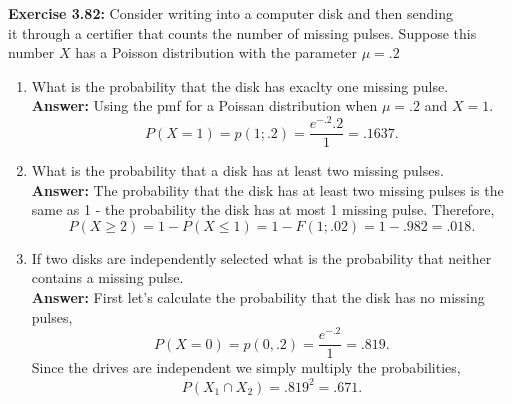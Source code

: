 \documentclass[12pt]{article}
\theoremstyle{homework}
\begin{document}
\hspace{.5in}\textbf{Exercise 3.82:} Consider writing into a computer disk and then sending\\

it through a certifier that counts the number of missing pulses. Suppose this number $X$ has a 
Poisson distribution with the parameter $\mu = .2$\\

\begin{enumerate}
  \item What is the probability that the disk has exaclty one missing pulse. \\
  
  \textbf{Answer:} Using the pmf for a Poissan distribution when $\mu = .2$ and $X = 1$.
\begin{equation*}
  P(X = 1) = p(1;.2) = \dfrac{e^{-.2}.2}{1} = .1637.
\end{equation*}
  \vspace{.25in}

  
  \item What is the probability that a disk has at least two missing pulses.\\
  
  \textbf{Answer:} The probability that the disk has at least two missing pulses is the same as
  1 - the probability the disk has at most 1 missing pulse. Therefore,
  \begin{equation*}
    P(X \geq 2) = 1 - P(X \le 1) = 1 - F(1;.02) = 1 - .982 = .018.
  \end{equation*}
  \vspace{.25in}

  
  \item If two disks are independently selected what is the probability that neither contains a missing pulse.\\
  
  \textbf{Answer:} First let's calculate the probability that the disk has no missing pulses,
  \begin{equation*}
    P(X = 0) = p(0,.2) = \dfrac{e^{-.2}}{1} =.819.
  \end{equation*}
  Since the drives are independent we simply multiply the probabilities, 
  \begin{equation*}
    P(X_1 \cap X_2) = .819^2 = .671.
  \end{equation*}
  \vspace{.5in}
\end{enumerate}
\end{document}
